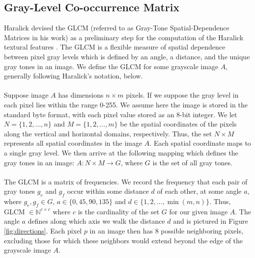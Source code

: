\documentclass{article}
\begin{document}
\subsection{Gray-Level Co-occurrence Matrix}
    Haralick devised the GLCM (referred to as Gray-Tone Spatial-Dependence Matrices in his work) as a preliminary step for the computation of the Haralick textural features \cite{haralick}. The GLCM is a flexible measure of spatial dependence between pixel gray levels which is defined by an angle, a distance, and the unique gray tones in an image. We define the GLCM for some grayscale image $A$, generally following Haralick's notation, below. \\ \\
    Suppose image $A$ has dimensions $n \times m$ pixels. If we suppose the gray level in each pixel lies within the range 0-255. We assume here the image is stored in the standard byte format, with each pixel value stored as an 8-bit integer. We let $N = \{ 1, 2, ..., n\}$ and $M = \{1, 2, ..., m\}$ be the spatial coordinates of the pixels along the vertical and horizontal domains, respectively. Thus, the set $N \times M $ represents all spatial coordinates in the image $A$. Each spatial coordinate maps to a single gray level. We then arrive at the following mapping which defines the gray tones in an image: $ A:  N \times M \to G$, where $G$ is the set of all gray tones. \\ \\
    The GLCM is a matrix of frequencies. We record the frequency that each pair of gray tones $g_e$ and $g_f$ occur within some distance $d$ of each other, at some angle $a$, where $g_e, g_f \in G$, $a \in \{0, 45, 90, 135\}$ and $d \in \{1, 2, ..., \min(m, n)\}$. Thus, GLCM $\in \mathbb{N}^{c \times c}$ where $c$ is the cardinality of the set $G$ for our given image $A$. The angle $a$ defines along which axis we walk the distance $d$ and is pictured in Figure \ref{fig:directions}. Each pixel $p$ in an image then has 8 possible neighboring pixels, excluding those for which these neighbors would extend beyond the edge of the grayscale image $A$. \\ \\
\end{document}
